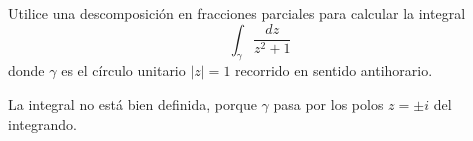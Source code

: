 \begin{exercise}
Utilice una descomposición en fracciones parciales para calcular la integral
$$\int_\gamma \frac {dz} {z^2 + 1}$$
donde $\gamma$ es el círculo unitario $|z| = 1$ recorrido en sentido antihorario.
\end{exercise}

\begin{solution}
La integral no está bien definida, porque $\gamma$ pasa por los polos $z = \pm i$ del integrando.
\end{solution}
